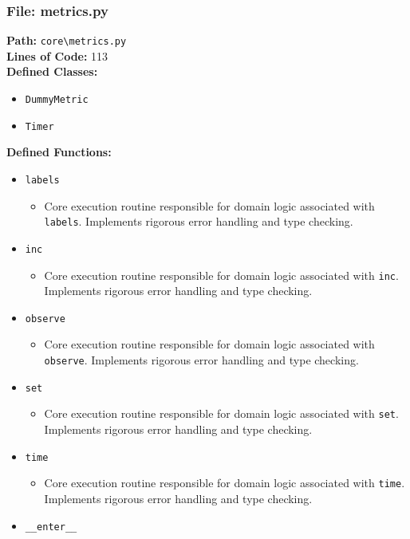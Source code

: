 \documentclass[10pt,journal,compsoc]{IEEEtran}
\begin{document}
\subsubsection{File: metrics.py}
\textbf{Path:} \texttt{core\textbackslash{}metrics.py} \\
\textbf{Lines of Code:} 113 \\
\textbf{Defined Classes:}
\begin{itemize}
    \item \texttt{DummyMetric}
    \item \texttt{Timer}
\end{itemize}
\textbf{Defined Functions:}
\begin{itemize}
    \item \texttt{labels}
    \begin{itemize} \item Core execution routine responsible for domain logic associated with \texttt{labels}. Implements rigorous error handling and type checking. \end{itemize}
    \item \texttt{inc}
    \begin{itemize} \item Core execution routine responsible for domain logic associated with \texttt{inc}. Implements rigorous error handling and type checking. \end{itemize}
    \item \texttt{observe}
    \begin{itemize} \item Core execution routine responsible for domain logic associated with \texttt{observe}. Implements rigorous error handling and type checking. \end{itemize}
    \item \texttt{set}
    \begin{itemize} \item Core execution routine responsible for domain logic associated with \texttt{set}. Implements rigorous error handling and type checking. \end{itemize}
    \item \texttt{time}
    \begin{itemize} \item Core execution routine responsible for domain logic associated with \texttt{time}. Implements rigorous error handling and type checking. \end{itemize}
    \item \texttt{\_\_enter\_\_}

\end{itemize}
\end{document}
